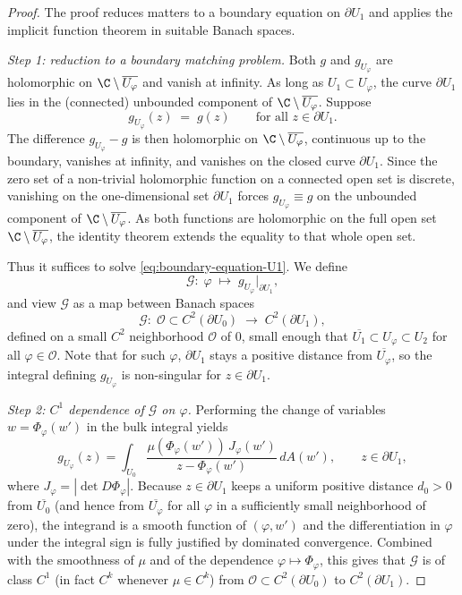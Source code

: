 \begin{proof}
The proof reduces matters to a boundary equation on \(\partial U_1\) and
applies the implicit function theorem in suitable Banach spaces.

\medskip
\noindent\emph{Step 1: reduction to a boundary matching problem.}
Both \(g\) and \(g_{U_\varphi}\) are holomorphic on
\(\C\setminus \overline{U_\varphi}\) and vanish at infinity. As long as
\(U_1\subset U_\varphi\), the curve \(\partial U_1\) lies in the (connected)
unbounded component of \(\C\setminus \overline{U_\varphi}\). Suppose
\begin{equation}\label{eq:boundary-equation-U1}
g_{U_\varphi}(z)\;=\;g(z)
\qquad \text{for all }z\in \partial U_1.
\end{equation}
The difference \(g_{U_\varphi}-g\) is then holomorphic on
\(\C\setminus \overline{U_\varphi}\), continuous up to the boundary, vanishes
at infinity, and vanishes on the closed curve \(\partial U_1\). Since the
zero set of a non-trivial holomorphic function on a connected open set is
discrete, vanishing on the one-dimensional set \(\partial U_1\) forces
\(g_{U_\varphi}\equiv g\) on the unbounded component of
\(\C\setminus \overline{U_\varphi}\). As both functions are holomorphic on
the full open set \(\C\setminus \overline{U_\varphi}\), the identity theorem
extends the equality to that whole open set.

Thus it suffices to solve \eqref{eq:boundary-equation-U1}. We define
\[
\mathcal{G}:\;\varphi\;\longmapsto\;g_{U_\varphi}\big|_{\partial U_1},
\]
and view \(\mathcal{G}\) as a map between Banach spaces
\[
\mathcal{G}\colon\;
\mathcal{O}\subset C^2(\partial U_0)\;\longrightarrow\;C^2(\partial U_1),
\]
defined on a small \(C^2\) neighborhood \(\mathcal{O}\) of \(0\), small
enough that \(\overline{U_1}\subset U_\varphi\subset U_2\) for all
\(\varphi\in \mathcal{O}\). Note that for such \(\varphi\), \(\partial U_1\)
stays a positive distance from \(\overline{U_\varphi}\), so the integral
defining \(g_{U_\varphi}\) is non-singular for \(z\in \partial U_1\).

\medskip
\noindent\emph{Step 2: \(C^1\) dependence of \(\mathcal{G}\) on \(\varphi\).}
Performing the change of variables \(w=\Phi_\varphi(w')\) in the bulk integral
yields
\[
g_{U_\varphi}(z)
=
\int_{U_0}
\frac{\mu(\Phi_\varphi(w'))\,J_\varphi(w')}{z-\Phi_\varphi(w')}\,dA(w'),
\qquad z\in \partial U_1,
\]
where \(J_\varphi=|\det D\Phi_\varphi|\). Because \(z\in \partial U_1\) keeps
a uniform positive distance \(d_0>0\) from
\(\overline{U_0}\) (and hence from \(\overline{U_\varphi}\) for all
\(\varphi\) in a sufficiently small neighborhood of zero), the integrand is a
smooth function of \((\varphi,w')\) and the differentiation in \(\varphi\)
under the integral sign is fully justified by dominated convergence.
Combined with the smoothness of \(\mu\) and of the dependence
\(\varphi\mapsto \Phi_\varphi\), this gives that \(\mathcal{G}\) is of class
\(C^1\) (in fact \(C^k\) whenever \(\mu\in C^k\)) from
\(\mathcal{O}\subset C^2(\partial U_0)\) to \(C^2(\partial U_1)\).


\end{proof}
